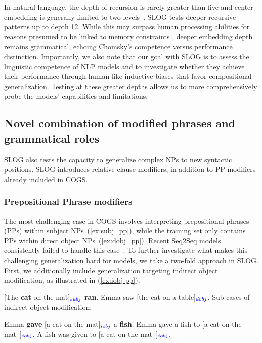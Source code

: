 In natural language, the depth of recursion is rarely greater than five and center embedding is generally limited to two levels~\citep{karlsson2007constraints,karlsson2010syntactic}. SLOG tests deeper recursive patterns up to depth 12. While this may surpass human processing abilities for reasons presumed to be linked to memory constraints \citep{gibson1999memory,karlsson2007constraints}, deeper embedding depth remains grammatical, echoing Chomsky’s competence versus performance distinction. Importantly, we also note that our goal with SLOG is to assess the linguistic competence of NLP models and to investigate whether they achieve their performance through human-like inductive biases that favor compositional generalization. Testing at these greater depths allows us to more comprehensively probe the models' capabilities and limitations. 

\subsection{Novel combination of modified phrases and grammatical roles} \label{subsec:cat_mod}

SLOG also tests the capacity to generalize complex NPs to new syntactic positions. SLOG introduces relative clause modifiers, in addition to PP modifiers already included in COGS.
\subsubsection{Prepositional Phrase modifiers} \label{subsubsec:pp-mod}

The most challenging case in COGS involves interpreting prepositional phrases (PPs) within subject NPs~(\ref{ex:subj_pp}), while the training set only contains PPs within direct object NPs~(\ref{ex:dobj_pp}). Recent Seq2Seq models consistently failed to handle this case~\citep{akyurek-andreas-2021-lexicon,zheng-lapata-2022-disentangled,yao-koller-2022-structural}. To further investigate what makes this challenging generalization hard for models, we take a two-fold approach in SLOG. First, we additionally include generalization targeting indirect object modification, as illustrated in (\ref{ex:iobj-pp}).

\begin{exe}
    \ex \label{ex:subj_pp}[The {\bf cat} on the mat]$_{\textcolor{blue}{subj}}$ {\bf ran}. 
    \ex \label{ex:dobj_pp}Emma saw [the cat on a table]$_{\textcolor{blue}{dobj}}$.
    \ex \label{ex:iobj-pp}Sub-cases of indirect object modification:
    \begin{xlist}
        \ex \label{ex:iobj}Emma {\bf gave} [a cat on the mat]$_{\textcolor{blue}{iobj}}$ a {\bf fish}.
        \ex \label{ex:iobj_dat2} Emma gave a fish to [a cat on the \mbox{mat ]$_{\textcolor{blue}{iobj}}$}. 
        \ex \label{ex:iobj_dat3} A fish was given to [a cat on the \mbox{mat ]$_{\textcolor{blue}{iobj}}$}.
    \end{xlist}
\end{exe}

